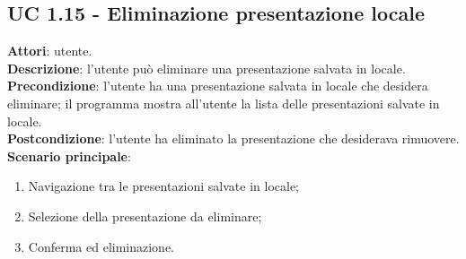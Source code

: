\subsection{UC 1.15 - Eliminazione presentazione locale}{
	\label{uc1.15}
	\textbf{Attori}: utente.\\
	\textbf{Descrizione}: l'utente può eliminare una presentazione salvata in locale.\\
	\textbf{Precondizione}: l'utente ha una presentazione salvata in locale che desidera eliminare; il programma mostra all'utente la lista delle presentazioni salvate in locale.\\
	\textbf{Postcondizione}: l'utente ha eliminato la presentazione che desiderava rimuovere.\\
	\textbf{Scenario principale}:
	\begin{enumerate}
		\item Navigazione tra le presentazioni salvate in locale;
		\item Selezione della presentazione da eliminare;
		\item Conferma ed eliminazione.
	\end{enumerate}
}